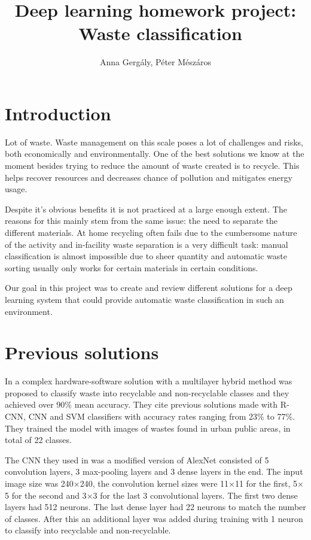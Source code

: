 \documentclass[twocolumn]{article}
\begin{document}
	\title{Deep learning homework project: \ Waste classification}
	\author{Anna Gergály, Péter Mészáros}
	\maketitle
	
	\section{Introduction}
	Lot of waste. Waste management on this scale poses a lot of challenges and risks, both economically and environmentally. One of the best solutions we know at the moment besides trying to reduce the amount of waste created is to recycle. This helps recover resources and decreases chance of pollution and mitigates energy usage. 
	
	Despite it's obvious benefits it is not practiced at a large enough extent. The reasons for this mainly stem from the same issue: the need to separate the different materials. At home recycling often fails due to the cumbersome nature of the activity and in-facility waste separation is a very difficult task: manual classification is almost impossible due to sheer quantity and automatic waste sorting usually only works for certain materials in certain conditions.
	
	Our goal in this project was to create and review different solutions for a deep learning system that could provide automatic waste classification in such an environment.
	\section{Previous solutions}\label{sec:prevsolutions}
	In \cite{Chu2018} a complex hardware-software solution with a multilayer hybrid method was proposed to classify waste into recyclable and non-recyclable classes and they achieved over 90\% mean accuracy. They cite previous solutions made with R-CNN, CNN and SVM classifiers with accuracy rates ranging from 23\% to 77\%. They trained the model with images of wastes found in urban public areas, in total of 22 classes.
	
	The CNN they used in \cite{Chu2018} was a modified version of AlexNet \cite{AlexNet} consisted of 5 convolution layers, 3 max-pooling layers and 3 dense layers in the end. The input image size was 240$\times$240, the convolution kernel sizes were 11$\times$11 for the first, 5$\times$5 for the second and 3$\times$3 for the last 3 convolutional layers. The first two dense layers had 512 neurons. The last dense layer had 22 neurons to match the number of classes. After this an additional layer was added during training with 1 neuron to classify into recyclable and non-recyclable.
	
\end{document}

